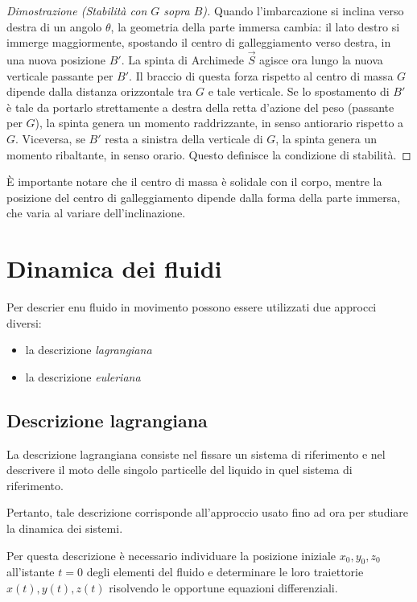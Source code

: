\documentclass[11pt, a4paper, openright]{book}
\theoremstyle{plain}
\theoremstyle{definition}
\begin{document}
\begin{itemize}
    \begin{proof}[Dimostrazione (Stabilità con $G$ sopra $B$)]
    Quando l'imbarcazione si inclina verso destra di un angolo $\theta$, la geometria della parte immersa cambia: il lato destro si immerge maggiormente, spostando il centro di galleggiamento verso destra, in una nuova posizione $B'$.
    La spinta di Archimede $\vec{S}$ agisce ora lungo la nuova verticale passante per $B'$. Il braccio di questa forza rispetto al centro di massa $G$ dipende dalla distanza orizzontale tra $G$ e tale verticale.
    Se lo spostamento di $B'$ è tale da portarlo strettamente a destra della retta d'azione del peso (passante per $G$), la spinta genera un momento raddrizzante, in senso antiorario rispetto a $G$. Viceversa, se $B'$ resta a sinistra della verticale di $G$, la spinta genera un momento ribaltante, in senso orario. Questo definisce la condizione di stabilità.
    \end{proof}
\end{itemize}
È importante notare che il centro di massa è solidale con il corpo, mentre la posizione del centro di galleggiamento dipende dalla forma della parte immersa, che varia al variare dell'inclinazione.

\section{Dinamica dei fluidi}
Per descrier enu fluido in movimento possono essere utilizzati due approcci diversi:
\begin{itemize}
    \item la descrizione \textit{lagrangiana}
    \item la descrizione \textit{euleriana}
\end{itemize}
\subsection{Descrizione lagrangiana}
La descrizione lagrangiana consiste nel fissare un sistema di riferimento e nel descrivere il moto delle singolo particelle del liquido in quel sistema di riferimento.

Pertanto, tale descrizione corrisponde all'approccio usato fino ad ora per studiare la dinamica dei sistemi.

Per questa descrizione è necessario individuare la posizione iniziale $x_0, y_0, z_0$ all'istante $t = 0$ degli elementi del fluido e determinare le loro traiettorie $x(t), y(t), z(t)$ risolvendo le opportune equazioni differenziali.
\end{document}

